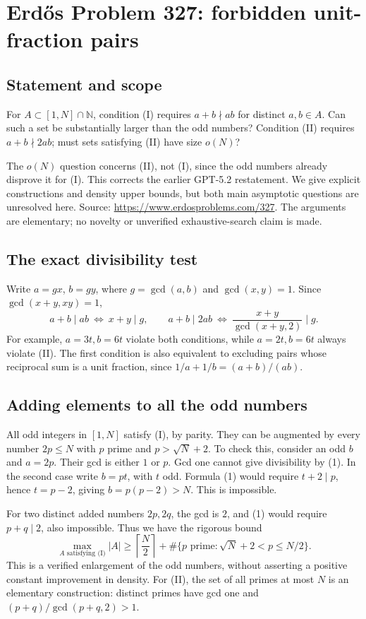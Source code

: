 \section*{Erd\H{o}s Problem 327: forbidden unit-fraction pairs}
\subsection*{Statement and scope}
For $A\subset[1,N]\cap\mathbb N$, condition (I) requires $a+b\nmid ab$ for distinct $a,b\in A$. Can such a set be substantially larger than the odd numbers? Condition (II) requires $a+b\nmid2ab$; must sets satisfying (II) have size $o(N)$?

The $o(N)$ question concerns (II), not (I), since the odd numbers already disprove it for (I). This corrects the earlier GPT-5.2 restatement. We give explicit constructions and density upper bounds, but both main asymptotic questions are unresolved here. Source: \url{https://www.erdosproblems.com/327}. The arguments are elementary; no novelty or unverified exhaustive-search claim is made.

\subsection*{The exact divisibility test}
Write $a=gx$, $b=gy$, where $g=\gcd(a,b)$ and $\gcd(x,y)=1$. Since $\gcd(x+y,xy)=1$,
\[
 a+b\mid ab\ \Longleftrightarrow\ x+y\mid g,\qquad
 a+b\mid2ab\ \Longleftrightarrow\
 \frac{x+y}{\gcd(x+y,2)}\mid g. \tag{1}
\]
For example, $a=3t,b=6t$ violate both conditions, while $a=2t,b=6t$ always violate (II). The first condition is also equivalent to excluding pairs whose reciprocal sum is a unit fraction, since $1/a+1/b=(a+b)/(ab)$.

\subsection*{Adding elements to all the odd numbers}
All odd integers in $[1,N]$ satisfy (I), by parity. They can be augmented by every number $2p\le N$ with $p$ prime and $p>\sqrt N+2$. To check this, consider an odd $b$ and $a=2p$. Their gcd is either $1$ or $p$. Gcd one cannot give divisibility by (1). In the second case write $b=pt$, with $t$ odd. Formula (1) would require $t+2\mid p$, hence $t=p-2$, giving $b=p(p-2)>N$. This is impossible.

For two distinct added numbers $2p,2q$, the gcd is $2$, and (1) would require $p+q\mid2$, also impossible. Thus we have the rigorous bound
\[
 \max_{A\text{ satisfying (I)}}|A|
 \ge \left\lceil\frac N2\right\rceil+
 \#\{p\text{ prime}:\sqrt N+2<p\le N/2\}. \tag{2}
\]
This is a verified enlargement of the odd numbers, without asserting a positive constant improvement in density. For (II), the set of all primes at most $N$ is an elementary construction: distinct primes have gcd one and $(p+q)/\gcd(p+q,2)>1$.

